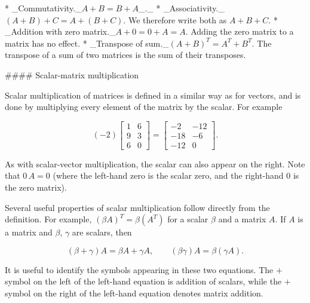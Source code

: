 * _Commutativity._\(A+B=B+A\)_._
* _Associativity._\((A+B)+C=A+(B+C)\). We therefore write both as \(A+B+C\).
* _Addition with zero matrix._\(A+0=0+A=A\). Adding the zero matrix to a matrix has no effect.
* _Transpose of sum._\((A+B)^{T}=A^{T}+B^{T}\). The transpose of a sum of two matrices is the sum of their transposes.

#### Scalar-matrix multiplication

Scalar multiplication of matrices is defined in a similar way as for vectors, and is done by multiplying every element of the matrix by the scalar. For example

\[(-2)\left[\begin{array}{cc}1&6\\ 9&3\\ 6&0\end{array}\right]=\left[\begin{array}{cc}-2&-12\\ -18&-6\\ -12&0\end{array}\right].\]

As with scalar-vector multiplication, the scalar can also appear on the right. Note that \(0\,A=0\) (where the left-hand zero is the scalar zero, and the right-hand \(0\) is the zero matrix).

Several useful properties of scalar multiplication follow directly from the definition. For example, \((\beta A)^{T}=\beta(A^{T})\) for a scalar \(\beta\) and a matrix \(A\). If \(A\) is a matrix and \(\beta\), \(\gamma\) are scalars, then

\[(\beta+\gamma)A=\beta A+\gamma A,\qquad(\beta\gamma)A=\beta(\gamma A).\]

It is useful to identify the symbols appearing in these two equations. The \(+\) symbol on the left of the left-hand equation is addition of scalars, while the \(+\) symbol on the right of the left-hand equation denotes matrix addition.

 
